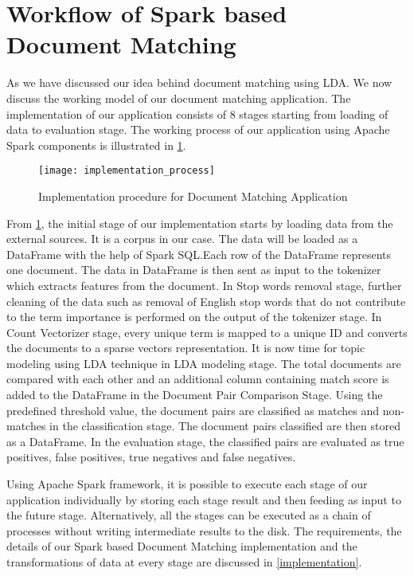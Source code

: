 \section{Workflow of Spark based Document Matching}
\label{section: workflow of spark based document matching}

As we have discussed our idea behind document matching using LDA. We now discuss the working model of our document matching application. The implementation of our application consists of 8 stages starting from loading of data to evaluation stage. The working process of our application using Apache Spark components is illustrated in \ref{fig: Implementation_process}.
\begin{figure}[htbp]
	\centering
		\texttt{[image: implementation\_process]}
	\caption{Implementation procedure for Document Matching Application}
	\label{fig: Implementation_process}
\end{figure}

\newpage
\par From \ref{fig: Implementation_process}, the initial stage of our implementation starts by loading data from the external sources. It is a corpus in our case. The data will be loaded as a DataFrame with the help of Spark SQL.Each row of the DataFrame represents one document. The data in DataFrame is then sent as input to the tokenizer which extracts features from the document. In Stop words removal stage, further cleaning of the data such as removal of English stop words that do not contribute to the term importance is performed on the output of the tokenizer stage. In Count Vectorizer stage, every unique term is mapped to a unique ID and converts the documents to a sparse vectors representation. It is now time for topic modeling using LDA technique in LDA modeling stage. The total documents are compared with each other and an additional column containing match score is added to the DataFrame in the Document Pair Comparison Stage. Using the predefined threshold value, the document pairs are classified as matches and non-matches in the classification stage. The document pairs classified are then stored as a DataFrame. In the evaluation stage, the classified pairs are evaluated as true positives, false positives, true negatives and false negatives. 

\par Using Apache Spark framework, it is possible to execute each stage of our application individually by storing each stage result and then feeding as input to the future stage. Alternatively, all the stages can be executed as a chain of processes without writing intermediate results to the disk. The requirements, the details of our Spark based Document Matching implementation and the transformations of data at every stage are discussed in \ref{implementation}.


